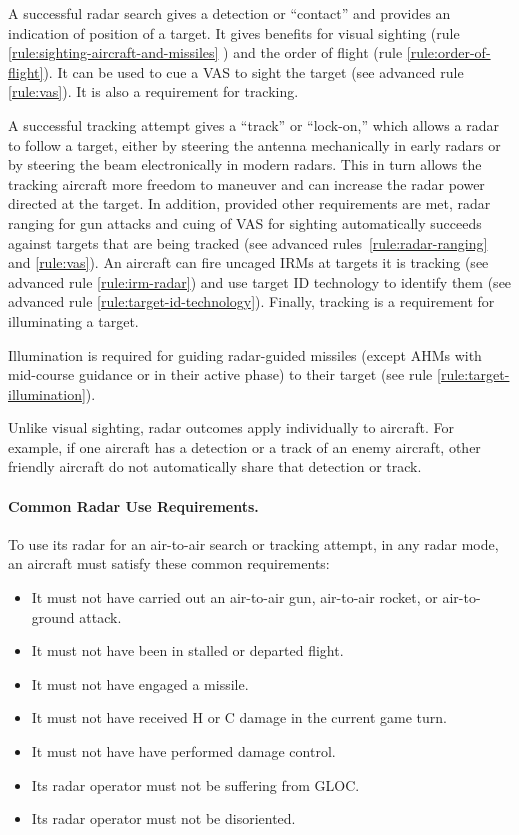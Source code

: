 {A successful radar search gives a detection or “contact” and provides an indication of position of a target. It gives benefits for visual sighting (rule \ref{rule:sighting-aircraft-and-missiles}
) and the order of flight (rule \ref{rule:order-of-flight}). It can be used to cue a VAS to sight the target (see advanced rule \ref{rule:vas}). It is also a requirement for tracking.

A successful tracking attempt gives a “track” or “lock-on,” which allows a radar to follow a target, either by steering the antenna mechanically in early radars or by steering the beam electronically in modern radars. This in turn allows the tracking aircraft more freedom to maneuver and can increase the radar power directed at the target. In addition, provided other requirements are met, radar ranging for gun attacks and cuing of VAS for sighting automatically succeeds against targets that are being tracked (see advanced rules~\ref{rule:radar-ranging} and \ref{rule:vas}). An aircraft can fire uncaged IRMs at targets it is tracking (see advanced rule \ref{rule:irm-radar}) and use target ID technology to identify them (see advanced rule \ref{rule:target-id-technology}). Finally, tracking is a requirement for illuminating a target. 

Illumination is required for guiding radar-guided missiles (except AHMs with mid-course guidance or in their active phase) to their target (see rule \ref{rule:target-illumination}).

Unlike visual sighting, radar outcomes apply individually to aircraft. For example, if one aircraft has a detection or a track of an enemy aircraft, other friendly aircraft do not automatically share that detection or track.

\paragraph{Common Radar Use Requirements.}
\label{rule:common-radar-use-requirements}

To use its radar for an air-to-air search or tracking attempt, in any radar mode, an aircraft must satisfy these common requirements:

    \begin{itemize}
        \item It must not have carried out an air-to-air gun, air-to-air rocket, or air-to-ground attack.
        \item It must not have been in stalled or departed flight.
        \item It must not have engaged a missile.
        \item It must not have received H or C damage in the current game turn.
        \item It must not have have performed damage control.
        \item Its radar operator must not be suffering from GLOC.
        \item Its radar operator must not be disoriented.
    \end{itemize}
    
}

